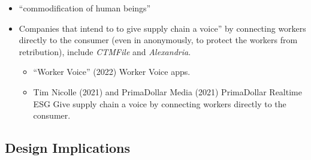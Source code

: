 \documentclass[
  letterpaper,
  DIV=11,
  numbers=noendperiod]{scrartcl}
\providecommand{\tightlist}{%
  \setlength{\itemsep}{0pt}\setlength{\parskip}{0pt}}\usepackage{longtable,booktabs,array}
\begin{document}
\begin{itemize}
\item
  ``commodification of human beings''
\item
  Companies that intend to to give supply chain a voice'' by connecting
  workers directly to the consumer (even in anonymously, to protect the
  workers from retribution), include \emph{CTMFile} and
  \emph{Alexandria}.

  \begin{itemize}
  \tightlist
  \item
    {``Worker {Voice}''} (2022) Worker Voice apps.
  \item
    Tim Nicolle (2021) and PrimaDollar Media (2021) PrimaDollar Realtime
    ESG Give supply chain a voice by connecting workers directly to the
    consumer.
  \end{itemize}
\end{itemize}

\subsection{Design Implications}\label{design-implications-4}
\end{document}
